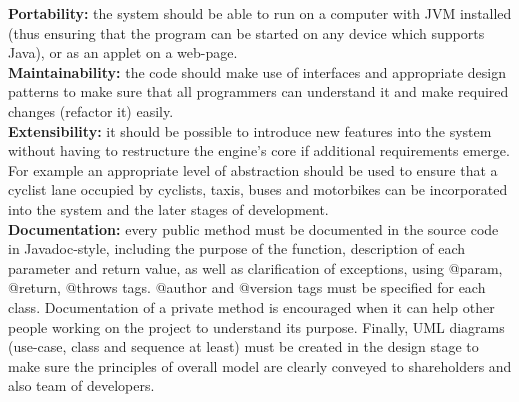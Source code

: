 \documentclass[]{article}
\begin{document}
\noindent 
\textbf{Portability: }the system should be able to run on a computer with JVM installed (thus ensuring that the program can be started on any device which supports Java), or as an applet on a web-page. \\

\noindent
\textbf{Maintainability:} the code should make use of interfaces and appropriate design patterns to make sure that all programmers can understand it and make required changes (refactor it) easily.\\

\noindent 
\textbf{Extensibility:} it should be possible to introduce new features into the system without having to restructure the engine’s core if additional requirements emerge. For example an appropriate level of abstraction should be used to ensure that a cyclist lane occupied by cyclists, taxis, buses and motorbikes can be incorporated into the system and the later stages of development.\\

\noindent
\textbf{Documentation:} every public method must be documented in the source code in Javadoc-style, including the purpose of the function, description of each parameter and return value, as well as clarification of exceptions, using @param, @return, @throws tags. @author and @version tags must be specified for each class. Documentation of a private method is encouraged when it can help other people working on the project to understand its purpose. Finally, UML diagrams (use-case, class and sequence at least) must be created in the design stage to make sure the principles of overall model are clearly conveyed to shareholders and also team of developers.  
\end{document}
